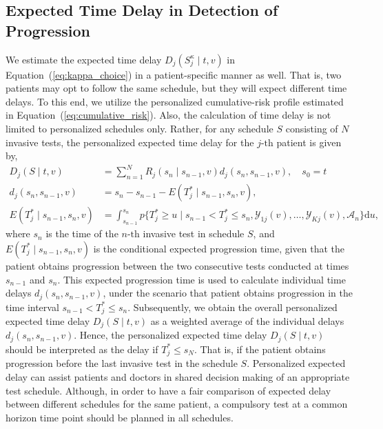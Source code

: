 \subsection{Expected Time Delay in Detection of Progression}
\label{subsec:exp_delay_estimation}
We estimate the expected time delay $D_j(S_j^{\kappa} \mid t, v)$ in Equation~(\ref{eq:kappa_choice}) in a patient-specific manner as well. That is, two patients may opt to follow the same schedule, but they will expect different time delays. To this end, we utilize the personalized cumulative-risk profile estimated in Equation~(\ref{eq:cumulative_risk}). Also, the calculation of time delay is not limited to personalized schedules only. Rather, for any schedule $S$ consisting of $N$ invasive tests, the personalized expected time delay for the ${j\mbox{-th}}$ patient is given by,
\begin{equation}
\label{eq:expected_delay}
\begin{split}
D_j(S \mid t, v) &= \sum_{n=1}^{N} R_j(s_n \mid s_{n-1}, v) d_j(s_n, s_{n-1}, v), \quad s_0 = t\\
d_j(s_n, s_{n-1}, v) &= s_n - s_{n-1} - E(T^*_j \mid s_{n-1}, s_n, v),\\
E(T^*_j \mid s_{n-1}, s_n, v) &= \int_{s_{n-1}}^{s_n} p\Big\{T^*_j \geq u \mid s_{n-1} < T^*_j \leq s_n, \mathcal{Y}_{1j}(v), \ldots, \mathcal{Y}_{Kj}(v), \mathcal{A}_n\Big\} \mathrm{d}u,
\end{split}
\end{equation}
where $s_n$ is the time of the ${n\mbox{-th}}$ invasive test in schedule $S$, and ${E(T^*_j \mid s_{n-1}, s_n, v)}$ is the conditional expected progression time, given that the patient obtains progression between the two consecutive tests conducted at times $s_{n-1}$ and $s_n$. This expected progression time is used to calculate individual time delays $d_j(s_n, s_{n-1}, v)$, under the scenario that patient obtains progression in the time interval $s_{n-1} < T^*_j \leq s_n$. Subsequently, we obtain the overall personalized expected time delay $D_j(S \mid t, v)$ as a weighted average of the individual delays $d_j(s_n, s_{n-1}, v)$. Hence, the personalized expected time delay $D_j(S \mid t, v)$ should be interpreted as the delay if $T^*_j \leq s_N$. That is, if the patient obtains progression before the last invasive test in the schedule $S$. Personalized expected delay can assist patients and doctors in shared decision making of an appropriate test schedule. Although, in order to have a fair comparison of expected delay between different schedules for the same patient, a compulsory test at a common horizon time point should be planned in all schedules.